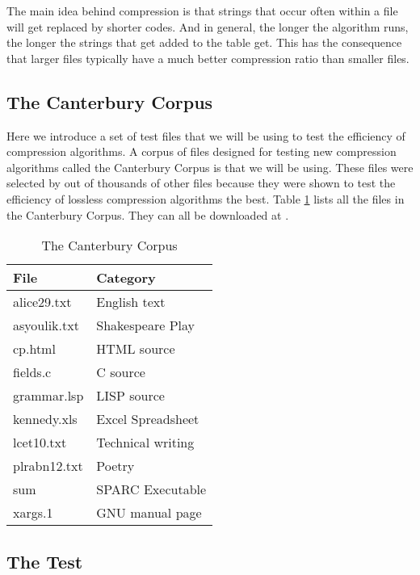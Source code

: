 The main idea behind \lzw compression is that strings that occur often
within a file will get replaced by shorter codes. And in general, the
longer the algorithm runs, the longer the strings that get added to
the table get. This has the consequence that larger files typically
have a much better compression ratio than smaller files.

\subsection{The Canterbury Corpus}

Here we introduce a set of test files that we will be using to test
the efficiency of compression algorithms. A corpus of files designed
for testing new compression algorithms called the Canterbury Corpus is
that we will be using. These files were selected by
\cite{arnold:corpus} out of thousands of other files because they were
shown to test the efficiency of lossless compression algorithms the
best. Table \ref{tab:corp-files} lists all the files in the Canterbury
Corpus. They can all be downloaded at \cite{powell:desc-corp}.

\begin{table}
  \centering
  \begin{tabular}{ll}
    \toprule
    File & Category \\
    \midrule
    alice29.txt & English text \\
    asyoulik.txt & Shakespeare Play \\
    cp.html & HTML source \\
    fields.c & C source \\
    grammar.lsp & LISP source \\
    kennedy.xls & Excel Spreadsheet \\
    lcet10.txt & Technical writing \\
    plrabn12.txt & Poetry \\
    sum & SPARC Executable \\
    xargs.1 & GNU manual page \\
    \bottomrule

  \end{tabular}
  \caption{The Canterbury Corpus}
  \label{tab:corp-files}
\end{table}

\subsection{The Test}

